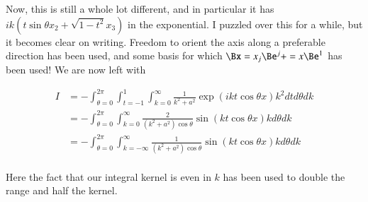 \documentclass{article}
\begin{document}
Now, this is still a whole lot different, and in particular it has $ik (t\sin\theta x_2 + \sqrt{1-t^2} x_3)$ in the exponential.  I puzzled over this for a while, but it becomes clear on writing.  Freedom to orient the axis along a preferable direction has been used, and some basis for which $\Bx = x_j \Be^j + = x \Be^1$ has been used!  We are now left with

\begin{align*}
I 
&= -\int_{\theta=0}^{2\pi} \int_{t=-1}^{1} \int_{k=0}^\infty \frac{1}{k^2 + a^2} \exp\left( i k t \cos\theta x \right) k^2 dt d\theta dk \\
&= -\int_{\theta=0}^{2\pi} \int_{k=0}^\infty \frac{2}{(k^2 + a^2) \cos\theta} \sin\left( k t \cos\theta x \right) k d\theta dk \\
&= -\int_{\theta=0}^{2\pi} \int_{k=-\infty}^\infty \frac{1}{(k^2 + a^2) \cos\theta} \sin\left( k t \cos\theta x \right) k d\theta dk \\
\end{align*}

Here the fact that our integral kernel is even in $k$ has been used to double the range and half the kernel.



\end{document}
